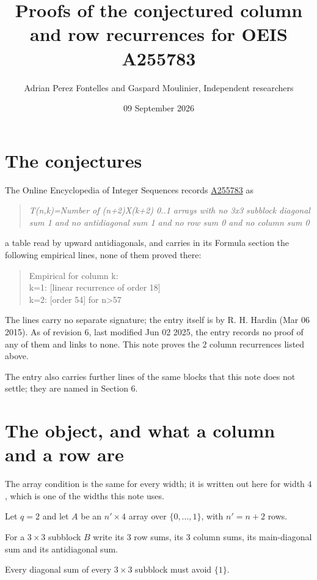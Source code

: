 \documentclass[11pt]{article}
\title{Proofs of the conjectured column and row recurrences for OEIS A255783}
\author{Adrian Perez Fontelles and Gaspard Moulinier, Independent researchers}
\date{09 September 2026}
\theoremstyle{definition}
\begin{document}
\maketitle
\section{The conjectures}

The Online Encyclopedia of Integer Sequences records \href{https://oeis.org/A255783}{A255783} as

\begin{quote}\itshape T(n,k)=Number of (n+2)X(k+2) 0..1 arrays with no 3x3 subblock diagonal sum 1 and no antidiagonal sum 1 and no row sum 0 and no column sum 0\end{quote}

a table read by upward antidiagonals, and carries in its Formula section the following empirical lines, none of them proved there:

\begin{quote}\ttfamily Empirical for column k:\\
k=1: [linear recurrence of order 18]\\k=2: [order 54] for n>57\end{quote}

The lines carry no separate signature; the entry itself is by R. H. Hardin (Mar 06 2015). As of revision 6, last modified Jun 02 2025, the entry records no proof of any of them and links to none. This note proves the 2 column recurrences listed above.

The entry also carries further lines of the same blocks that this note does not settle; they are named in Section 6.

\section{The object, and what a column and a row are}

The array condition is the same for every width; it is written out here for width $4$, which is one of the widths this note uses.

Let $q = 2$ and let $A$ be an $n' \times 4$ array over $\{0,\dots,1\}$, with $n' = n + 2$ rows.

For a $3\times3$ subblock $B$ write its 3 row sums, its 3 column sums, its main-diagonal sum and its antidiagonal sum.

Every diagonal sum of every $3\times3$ subblock must avoid $\{1\}$.
\end{document}
